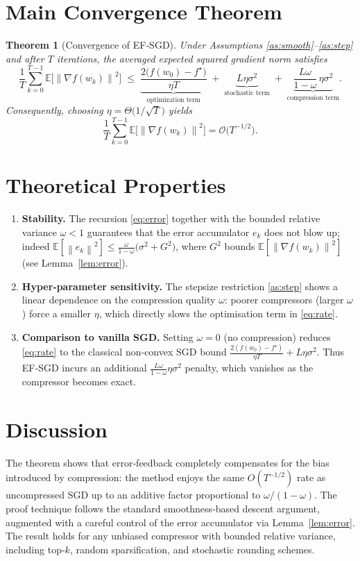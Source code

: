 \documentclass{article}
\newtheorem{theorem}{Theorem}
\newcommand{\E}{\mathbb{E}}
\newcommand{\norm}[1]{\left\lVert #1\right\rVert}
\begin{document}
\section*{Main Convergence Theorem}
\begin{theorem}[Convergence of EF‑SGD]\label{thm:main}
Under Assumptions \ref{as:smooth}–\ref{as:step} and after $T$ iterations,
the averaged expected squared gradient norm satisfies
\begin{equation}\label{eq:rate}
\frac{1}{T}\sum_{k=0}^{T-1}\E\!\big[\norm{\nabla f(w_k)}^{2}\big]
\;\le\;
\underbrace{\frac{2\big(f(w_0)-f^{\star}\big)}{\eta T}}_{\text{optimization term}}
\;+\;
\underbrace{L\eta\sigma^{2}}_{\text{stochastic term}}
\;+\;
\underbrace{\frac{L\omega}{1-\omega}\,\eta\sigma^{2}}_{\text{compression term}}.
\end{equation}
Consequently, choosing $\eta=\Theta\!\big(1/\sqrt{T}\big)$ yields
\[
    \frac{1}{T}\sum_{k=0}^{T-1}\E\!\big[\norm{\nabla f(w_k)}^{2}\big]
    =\mathcal{O}\!\big(T^{-1/2}\big).
\]
\end{theorem}

\section*{Theoretical Properties}
\begin{enumerate}[label=\arabic*.]
\item \textbf{Stability.} The recursion \eqref{eq:error} together with the bounded
relative variance $\omega<1$ guarantees that the error accumulator $e_k$ does not
blow up; indeed $\E[\norm{e_k}^{2}]\le\frac{\omega}{1-\omega}\big(\sigma^{2}+G^{2}\big)$,
where $G^{2}$ bounds $\E[\norm{\nabla f(w_k)}^{2}]$ (see Lemma~\ref{lem:error}).
\item \textbf{Hyper‑parameter sensitivity.}
The stepsize restriction \eqref{as:step} shows a linear dependence on the
compression quality $\omega$: poorer compressors (larger $\omega$) force a
smaller $\eta$, which directly slows the optimisation term in \eqref{eq:rate}.
\item \textbf{Comparison to vanilla SGD.}
Setting $\omega=0$ (no compression) reduces \eqref{eq:rate} to the classical
non‑convex SGD bound
$\frac{2(f(w_0)-f^{\star})}{\eta T}+L\eta\sigma^{2}$.
Thus EF‑SGD incurs an additional $\frac{L\omega}{1-\omega}\eta\sigma^{2}$ penalty,
which vanishes as the compressor becomes exact.
\end{enumerate}

\section*{Discussion}
The theorem shows that error‑feedback completely compensates for the
bias introduced by compression: the method enjoys the same $O(T^{-1/2})$ rate as
uncompressed SGD up to an additive factor proportional to $\omega/(1-\omega)$.
The proof technique follows the standard smoothness‑based descent argument,
augmented with a careful control of the error accumulator via Lemma~\ref{lem:error}.
The result holds for any unbiased compressor with bounded relative variance,
including top‑$k$, random sparsification, and stochastic rounding schemes.
\end{document}
